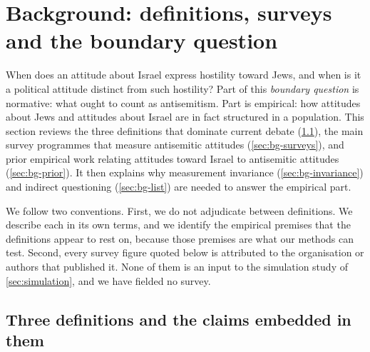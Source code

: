 \section{Background: definitions, surveys and the boundary question}\label{sec:background}

When does an attitude about Israel express hostility toward Jews, and when is it a political attitude distinct from such hostility? Part of this \emph{boundary question} is normative: what ought to count as antisemitism. Part is empirical: how attitudes about Jews and attitudes about Israel are in fact structured in a population. This section reviews the three definitions that dominate current debate (\cref{sec:bg-definitions}), the main survey programmes that measure antisemitic attitudes (\cref{sec:bg-surveys}), and prior empirical work relating attitudes toward Israel to antisemitic attitudes (\cref{sec:bg-prior}). It then explains why measurement invariance (\cref{sec:bg-invariance}) and indirect questioning (\cref{sec:bg-list}) are needed to answer the empirical part.

We follow two conventions. First, we do not adjudicate between definitions. We describe each in its own terms, and we identify the empirical premises that the definitions appear to rest on, because those premises are what our methods can test. Second, every survey figure quoted below is attributed to the organisation or authors that published it. None of them is an input to the simulation study of \cref{sec:simulation}, and we have fielded no survey.

\subsection{Three definitions and the claims embedded in them}\label{sec:bg-definitions}

